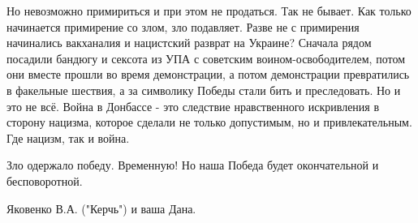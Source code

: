 Но невозможно примириться и при этом не продаться. Так не бывает. Как только
начинается примирение со злом, зло подавляет. Разве не с примирения начинались
вакханалия и нацистский разврат на Украине? Сначала рядом посадили бандюгу и
сексота из УПА с советским воином-освободителем, потом они вместе прошли во
время демонстрации, а потом демонстрации превратились в факельные шествия, а за
символику Победы стали бить и преследовать. Но и это не всё. Война в Донбассе -
это следствие нравственного искривления в сторону нацизма, которое сделали не
только допустимым, но и привлекательным. Где нацизм, так и война.

Зло одержало победу. Временную! Но наша Победа будет окончательной и
бесповоротной.

Яковенко В.А. ("Керчь") и ваша Дана.
